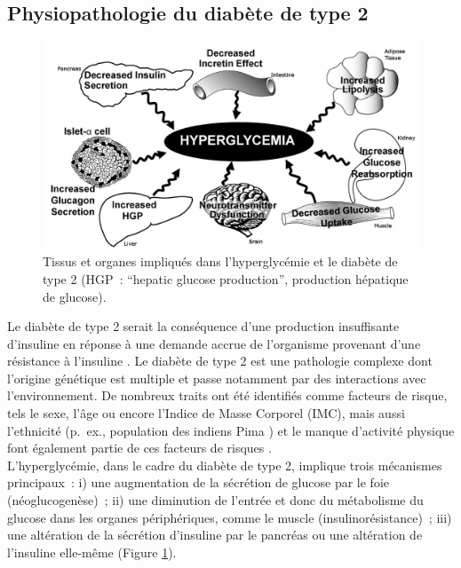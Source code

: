 \documentclass[11pt,a4paper,notrimn]{krantz}
\theoremstyle{definition}
\theoremstyle{definition}
\theoremstyle{remark}
\begin{document}
\subsection{Physiopathologie du diabète de type
2}\label{physiopathologie-du-diabete-de-type-2}





\begin{figure}[!htb]

{\centering \includegraphics[width=6in]{FiguresTables/hyperglycemia_t2d} 

}

\caption{Tissus et organes impliqués dans l'hyperglycémie et
le diabète de type 2 (HGP~: ``hepatic glucose production'', production
hépatique de glucose).}\label{fig:hyperglycemia}
\end{figure}

Le diabète de type 2 serait la conséquence d'une production insuffisante
d'insuline en réponse à une demande accrue de l'organisme provenant
d'une résistance à l'insuline
\citep{world_health_organization_definition_1999, world_health_organization_definition_2006}.
Le diabète de type 2 est une pathologie complexe dont l'origine
génétique est multiple et passe notamment par des interactions avec
l'environnement. De nombreux traits ont été identifiés comme facteurs de
risque, tels le sexe, l'âge ou encore l'Indice de Masse Corporel (IMC),
mais aussi l'ethnicité (p.~ex., population des indiens Pima
\citep{diamond_double_2003, knowler_determinants_1993}) et le manque
d'activité physique font également partie de ces facteurs de risques
\citep{lyssenko_clinical_2008, mykkanen_cardiovascular_1993, noble_risk_2011}.\\
L'hyperglycémie, dans le cadre du diabète de type 2, implique trois
mécanismes principaux~: i) une augmentation de la sécrétion de glucose
par le foie (néoglucogenèse)~; ii) une diminution de l'entrée et donc du
métabolisme du glucose dans les organes périphériques, comme le muscle
(insulinorésistance)~; iii) une altération de la sécrétion d'insuline
par le pancréas ou une altération de l'insuline elle-même (Figure
\ref{fig:hyperglycemia}).
\end{document}
